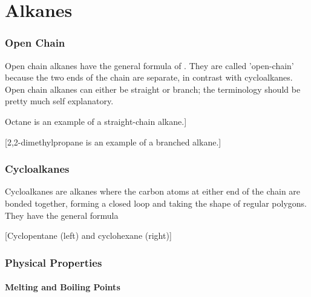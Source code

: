 

\pagebreak
\hypertarget{ChapterAlkanes}{}
\part{Alkanes}

	\section{Open Chain}

		Open chain alkanes have the general formula of . They are called 'open-chain' because
		the two ends of the chain are separate, in contrast with cycloalkanes. Open chain alkanes can either be straight or
		branch; the terminology should be pretty much self explanatory.

		\diagram{

			\chemfig{!\molMeR-[:330]-[:30]-[:330]-[:30]-[:330]-[:30]-[:330]!\molMe}

		}Octane is an example of a straight-chain alkane.]


		[2,2-dimethylpropane is an example of a branched alkane.]


	\section{Cycloalkanes}

		Cycloalkanes are alkanes where the carbon atoms at either end of the chain are bonded together, forming a closed loop and
		taking the shape of regular polygons. They have the general formula 

		[Cyclopentane (left) and cyclohexane (right)]



	\pagebreak
	\section{Physical Properties}
		\subsection{Melting and Boiling Points}


